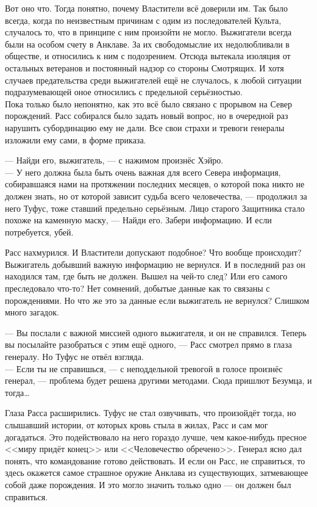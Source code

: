 Вот оно что. Тогда понятно, почему Властители всё доверили им. Так было всегда, 
когда по неизвестным причинам с одим из последователей Культа, случалось то, что 
в принципе с ним произойти не могло. Выжигатели всегда были на особом счету в 
Анклаве. За их свободомыслие их недолюбливали в обществе, и относились к ним с 
подозрением. Отсюда вытекала изоляция от остальных ветеранов и постоянный надзор 
со стороны Смотрящих. И хотя случаев предательства среди выжигателей ещё не 
случалось, к любой ситуации подразумевающей оное относились с предельной 
серьёзностью.\\

Пока только было непонятно, как это всё было связано с прорывом на Север 
порождений. Расс собирался было задать новый вопрос, но в очередной раз нарушить 
субординацию ему не дали. Все свои страхи и тревоги генералы изложили ему сами, 
в форме приказа.

\noindent --- Найди его, выжигатель, --- с нажимом произнёс Хэйро.\\ 
--- У него должна была быть очень важная для всего Севера информация, 
собиравшаяся нами на протяжении последних месяцев, о которой пока никто не 
должен знать, но от которой зависит судьба всего человечества, --- продолжил за 
него Туфус, тоже ставший предельно серьёзным. Лицо старого Защитника стало 
похоже на каменную маску, --- Найди его. Забери информацию. И если потребуется, 
убей.

Расс нахмурился. И Властители допускают подобное? Что вообще происходит? 
Выжигатель добывший важную информацию не вернулся. И в последний раз он 
находился там, где быть не должен. Вышел на чей-то след? Или его самого 
преследовало что-то? Нет сомнений, добытые данные как то связаны с порождениями. 
Но что же это за данные если выжигатель не вернулся?
Слишком много загадок.

\noindent --- Вы послали с важной миссией одного выжигателя, и он не 
справился. Теперь вы посылайте разобраться с этим ещё одного, --- Расс смотрел 
прямо в глаза генералу. Но Туфус не отвёл взгляда.\\
--- Если ты не справишься, --- с неподдельной тревогой в голосе произнёс 
генерал, --- проблема будет решена другими методами. Сюда пришлют Безумца, и 
тогда\ldots

Глаза Расса расширились. Туфус не стал озвучивать, что произойдёт тогда, но 
слышавший истории, от которых кровь стыла в жилах, Расс и сам мог догадаться. 
Это подействовало на него гораздо лучше, чем какое-нибудь пресное <<миру придёт 
конец>> или <<Человечество обречено>>. Генерал ясно дал понять, что 
командование готово действовать. И если он Расс, не справиться, то здесь 
окажется самое страшное оружие Анклава из существующих, затмевающее собой даже 
порождения. И это могло значить только одно --- он должен был справиться.

